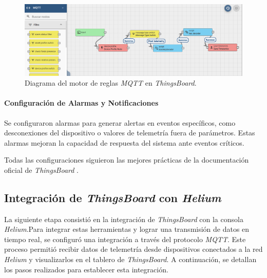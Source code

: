 \begin{figure}[H]
\leavevmode
\begin{minipage}{\textwidth}
\begin{center}
\includegraphics[width=\textwidth, height=0.5\textwidth]{./capitulo_04/imagen/tb/ruleengin.png}
\caption{Diagrama del motor de reglas \textit{MQTT} en \textit{ThingsBoard}. \label{fig:tbruls}}
\end{center}
\end{minipage}
\end{figure}

\paragraph{Configuración de Alarmas y Notificaciones\\}

Se configuraron alarmas para generar alertas en eventos específicos, como desconexiones del dispositivo o valores de telemetría fuera de parámetros. Estas alarmas mejoran la capacidad de respuesta del sistema ante eventos críticos. 

Todas las configuraciones siguieron las mejores prácticas de la documentación oficial de \textit{ThingsBoard} \cite{ThingsBoard_docs2}.




\subsection{Integración de \textit{ThingsBoard} con \textit{Helium}}

La siguiente etapa consistió en la integración de \textit{ThingsBoard} con la consola \textit{Helium}.Para integrar estas herramientas y lograr una transmisión de datos en tiempo real, se configuró una integración a través del protocolo \textit{MQTT}. Este proceso permitió recibir datos de telemetría desde dispositivos conectados a la red \textit{Helium} y visualizarlos en el tablero de \textit{ThingsBoard}. A continuación, se detallan los pasos realizados para establecer esta integración.

